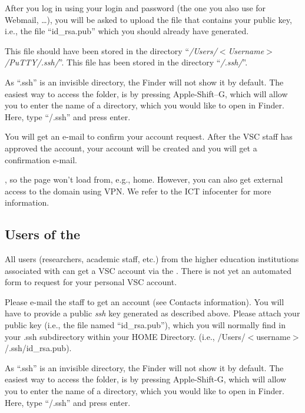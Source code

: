 After you log in using your \university login and password (the one you also
use for Webmail, \ldots ), you will be asked to upload the file that contains
your public key, i.e., the file ``id\_rsa.pub'' which you should already have
generated.

\ifwindows
  This file should have been stored in the directory
  ``\emph{/Users/$<$Username$>$/PuTTY/.ssh/}''.
\fi
\ifmacORlinux
  This file has been stored in the directory ``\emph{\tilde/.ssh/}''.
\fi

\ifmac
\begin{tip}
  As ``.ssh'' is an invisible directory, the Finder will
  not show it by default. The easiest way to access the folder, is by pressing
  Apple-Shift--G, which will allow you to enter the name of a directory, which
  you would like to open in Finder. Here, type ``\tilde/.ssh'' and press enter.
\end{tip}
\fi

You will get an e-mail to confirm your account request. After the VSC staff has
approved the account, your account will be created and you will get a
confirmation e-mail.

\ifantwerpen %
, so the page won't load from, e.g., home. However, you can also get
external access to the \university domain using VPN. We refer to the \university ICT infocenter
for more information.

\subsection{Users of the \association}
\label{sec:users-of-association}

All users (researchers, academic staff, etc.) from the higher education
institutions associated with \university can get a VSC account via the \university. There is not
yet an automated form to request for your personal VSC account.

Please e-mail the \hpc staff to get an account (see Contacts information).
You will have to provide a public \emph{ssh} key generated as described
above. Please attach your public key (i.e., the file named ``id\_rsa.pub''),
which you will normally find in your .ssh subdirectory within your HOME
Directory. (i.e., /Users/$<$username$>$/.ssh/id\_rsa.pub).


\ifmac %
\begin{tip}
  As ``.ssh'' is an invisible directory, the Finder will
  not show it by default. The easiest way to access the folder, is by pressing
  Apple-Shift-G, which will allow you to enter the name of a directory, which
  you would like to open in Finder. Here, type ``\tilde/.ssh'' and press enter.
\end{tip}
\fi %
\fi %

